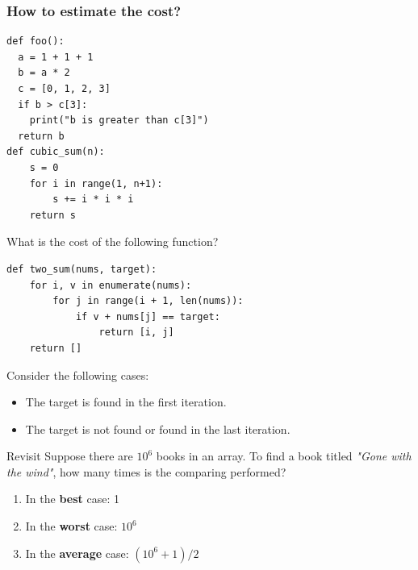 \documentclass[aspectratio=169, 14pt]{beamer}
\begin{document}
\begin{frame}[fragile]
	\frametitle{How to estimate the cost?}
	\begin{verbatim}
def foo():
  a = 1 + 1 + 1
  b = a * 2
  c = [0, 1, 2, 3]
  if b > c[3]:
    print("b is greater than c[3]")
  return b
def cubic_sum(n):
    s = 0
    for i in range(1, n+1):
        s += i * i * i
    return s
\end{verbatim}
\end{frame}

\begin{frame}[fragile]

	{\large {}} What is the cost of the following function?

	\begin{verbatim}
def two_sum(nums, target):
    for i, v in enumerate(nums):
        for j in range(i + 1, len(nums)):
            if v + nums[j] == target:
                return [i, j]
    return []
\end{verbatim}

	Consider the following cases:
	\begin{itemize}
		\item The target is found in the first iteration.
		\item The target is not found or found in the last iteration.
	\end{itemize}
\end{frame}

\begin{frame}[fragile]
	\begin{block}{Revisit}
		Suppose there are $10^6$ books in an array. To find a book titled \emph{"Gone with the wind"}, how many times is the comparing performed?
		\begin{enumerate}
			\item In the \textbf{best} case: 1
			\item In the \textbf{worst} case: $10^6$
			\item In the \textbf{average} case: $(10^6 + 1)/2$
		\end{enumerate}
	\end{block}


\end{frame}
\end{document}
